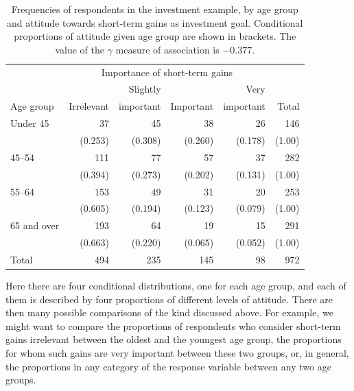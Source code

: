 \begin{table}
\caption{Frequencies of respondents in the investment example, by age group and
attitude towards short-term gains as investment goal.
Conditional proportions of attitude given age group are shown in
brackets. The value of the $\gamma$ measure of association is $-0.377$.}
\label{t_investors}
\begin{center}
\begin{tabular}{|l|rrrr|r|}\hline
& \multicolumn{4}{|c|}{Importance of short-term gains} & \\
 & & Slightly & & Very & \\
Age group & Irrelevant & important & Important & important & Total \\ \hline
Under 45 &  37 &  45 &  38 &  26 & 146 \\
 &  (0.253) & (0.308) & (0.260) & (0.178) & (1.00) \\
45--54 &  111 &  77 &  57 &  37 & 282 \\
 &  (0.394) & (0.273) & (0.202) & (0.131) & (1.00) \\
55--64 & 153 &  49 &  31 &  20 & 253 \\
 & (0.605) & (0.194) & (0.123) & (0.079) & (1.00)  \\
65 and over &  193 &  64 &  19 &  15 & 291 \\
 & (0.663) & (0.220) & (0.065) & (0.052) & (1.00)  \\
\hline
Total & 494 & 235 & 145 & 98 & 972 \\
\hline
\end{tabular}
\end{center}

\end{table}

Here there are four conditional distributions, one for each age group,
and each of them is described by four proportions of different levels of
attitude. There are then many possible comparisons of the kind discussed
above. For example, we might want to compare the proportions of
respondents who consider short-term gains irrelevant between the oldest
and the youngest age group, the proportions for whom such gains are very
important between these two groups, or, in general, the proportions in
any category of the response variable between any two age groups.

